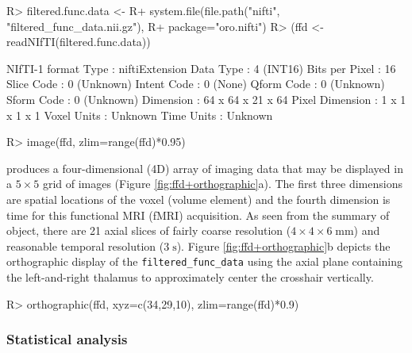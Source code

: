\documentclass[
]{jss}
\begin{document}
\begin{CodeChunk}

\begin{CodeInput}
R> filtered.func.data <- 
R+   system.file(file.path("nifti", "filtered_func_data.nii.gz"), 
R+               package="oro.nifti")
R> (ffd <- readNIfTI(filtered.func.data))
\end{CodeInput}

\begin{CodeOutput}
NIfTI-1 format
  Type            : niftiExtension
  Data Type       : 4 (INT16)
  Bits per Pixel  : 16
  Slice Code      : 0 (Unknown)
  Intent Code     : 0 (None)
  Qform Code      : 0 (Unknown)
  Sform Code      : 0 (Unknown)
  Dimension       : 64 x 64 x 21 x 64
  Pixel Dimension : 1 x 1 x 1 x 1
  Voxel Units     : Unknown
  Time Units      : Unknown
\end{CodeOutput}
\end{CodeChunk}

\begin{CodeChunk}

\begin{CodeInput}
R> image(ffd, zlim=range(ffd)*0.95)
\end{CodeInput}
\end{CodeChunk}

produces a four-dimensional (4D) array of imaging data that may be
displayed in a \(5{\times}5\) grid of images (Figure
\ref{fig:ffd+orthographic}a). The first three dimensions are spatial
locations of the voxel (volume element) and the fourth dimension is time
for this functional MRI (fMRI) acquisition. As seen from the summary of
object, there are 21 axial slices of fairly coarse resolution
(\(4{\times}4{\times}6\;\text{mm}\)) and reasonable temporal resolution
(\(3\;\text{s}\)). Figure \ref{fig:ffd+orthographic}b depicts the
orthographic display of the \texttt{filtered\_func\_data} using the
axial plane containing the left-and-right thalamus to approximately
center the crosshair vertically.

\begin{CodeChunk}

\begin{CodeInput}
R> orthographic(ffd, xyz=c(34,29,10), zlim=range(ffd)*0.9)
\end{CodeInput}
\end{CodeChunk}

\subsubsection{Statistical analysis}
\end{document}
